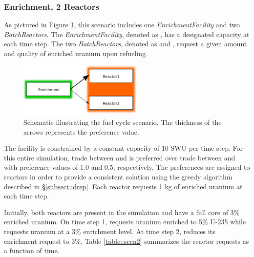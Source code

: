 \subsubsection{Enrichment, 2 Reactors}

As pictured in Figure \ref{fig::fc2}, this scenario includes
one \textit{EnrichmentFacility} and
two \textit{BatchReactors}. The \textit{EnrichmentFacility}, denoted
as \Enrichment{}, has a designated capacity at each time step. The
two \textit{BatchReactors}, denoted as  and , request a
given amount and quality of enriched uranium upon refueling.

\begin{figure}[ht!]
  \begin{center}
    \includegraphics[width=0.55\textwidth]{./figs/fc2.pdf}
    \caption[]{\label{fig::fc2}
        Schematic illustrating the fuel cycle scenario. The thickness of the arrows represents the preference value.}
  \end{center}
\end{figure}

The \Enrichment{} facility is constrained by a constant capacity of 10 SWU per
time step. For this entire simulation, trade between \Enrichment{}
and  is preferred over trade between \Enrichment{} and 
with preference values of 1.0 and 0.5, respectively. The preferences are
assigned to reactors in order to provide a consistent solution using the greedy
algorithm described in \S \ref{subsect::drep}. Each reactor requests 1 kg of
enriched uranium at each time step.

Initially, both reactors are present in the simulation and have a full core of
3\% enriched uranium. On time step 1,  requests uranium enriched to
5\% U-235 while  requests uranium at a 3\% enrichment level. At time
step 2,  reduces its enrichment request to
3\%. Table \ref{table::scen2} summarizes the reactor requests as a function of
time.

